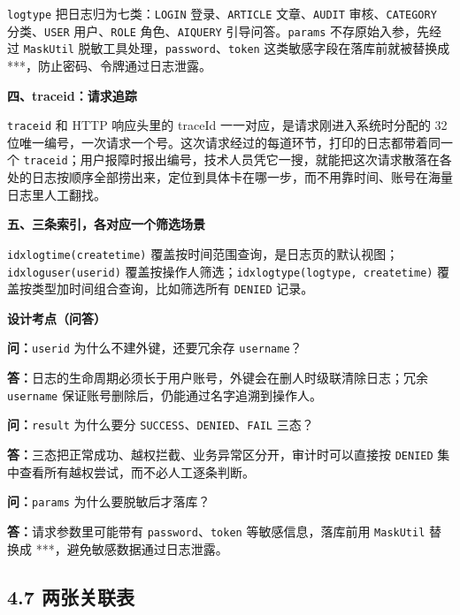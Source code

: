 \documentclass[zihao=-4,UTF8,openany]{ctexart}
\renewcommand{\_}{\textunderscore\allowbreak}
\begin{document}
\texttt{log\_type} 把日志归为七类：\texttt{LOGIN} 登录、\texttt{ARTICLE} 文章、\texttt{AUDIT} 审核、\texttt{CATEGORY} 分类、\texttt{USER} 用户、\texttt{ROLE} 角色、\texttt{AI\_QUERY} 引导问答。\texttt{params} 不存原始入参，先经过 \texttt{MaskUtil} 脱敏工具处理，\texttt{password}、\texttt{token} 这类敏感字段在落库前就被替换成 ***，防止密码、令牌通过日志泄露。

\noindent\textbf{四、trace\_id：请求追踪}

\texttt{trace\_id} 和 HTTP 响应头里的 traceId 一一对应，是请求刚进入系统时分配的 32 位唯一编号，一次请求一个号。这次请求经过的每道环节，打印的日志都带着同一个 \texttt{trace\_id}；用户报障时报出编号，技术人员凭它一搜，就能把这次请求散落在各处的日志按顺序全部捞出来，定位到具体卡在哪一步，而不用靠时间、账号在海量日志里人工翻找。

\noindent\textbf{五、三条索引，各对应一个筛选场景}

\texttt{idx\_log\_time(create\_time)} 覆盖按时间范围查询，是日志页的默认视图；\texttt{idx\_log\_user(user\_id)} 覆盖按操作人筛选；\texttt{idx\_log\_type(log\_type, create\_time)} 覆盖按类型加时间组合查询，比如筛选所有 \texttt{DENIED} 记录。

\noindent\textbf{设计考点（问答）}

\noindent\textbf{问：}\texttt{user\_id} 为什么不建外键，还要冗余存 \texttt{username}？

\noindent\textbf{答：}日志的生命周期必须长于用户账号，外键会在删人时级联清除日志；冗余 \texttt{username} 保证账号删除后，仍能通过名字追溯到操作人。

\noindent\textbf{问：}\texttt{result} 为什么要分 \texttt{SUCCESS}、\texttt{DENIED}、\texttt{FAIL} 三态？

\noindent\textbf{答：}三态把正常成功、越权拦截、业务异常区分开，审计时可以直接按 \texttt{DENIED} 集中查看所有越权尝试，而不必人工逐条判断。

\noindent\textbf{问：}\texttt{params} 为什么要脱敏后才落库？

\noindent\textbf{答：}请求参数里可能带有 \texttt{password}、\texttt{token} 等敏感信息，落库前用 \texttt{MaskUtil} 替换成 ***，避免敏感数据通过日志泄露。


\subsection*{\texorpdfstring{\textbf{4.7 两张关联表}}{4.7 两张关联表}}\label{ux4e24ux5f20ux5173ux8054ux8868}
\end{document}
